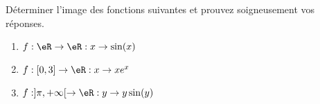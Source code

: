 
\begin{exercice}\label{exo0090}

Déterminer l'image des fonctions suivantes et prouvez soigneusement vos réponses.
\begin{enumerate}
\item $f: \eR \rightarrow \eR :x \rightarrow \sin(x)$
\item $f: [0,3] \rightarrow \eR : x \rightarrow x e^x$
\item $f : ] \pi, +\infty[ \rightarrow \eR : y \rightarrow y\sin(y)$
\end{enumerate}

\end{exercice}
